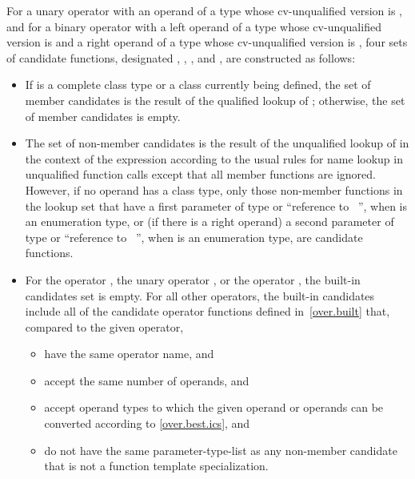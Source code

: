 \pnum
For a unary operator
with an operand of a type whose cv-unqualified version is
,
and for a binary operator
with a left operand of a type whose cv-unqualified version is
and a right operand of a type whose cv-unqualified version is
,
four sets of candidate functions, designated
,
,
,
and
,
are constructed as follows:
\begin{itemize}
\item
If
is a complete class type or a class currently being defined, the set of member candidates is the
result of the qualified lookup of
; otherwise, the set of member
candidates is empty.
\item
The set of non-member candidates is the result of the unqualified lookup of
in the context of
the expression according to the usual rules for name
lookup in unqualified function calls except
that all member functions are ignored.
However, if no operand has a class type, only those non-member
functions in the lookup set that have a first parameter of type
or ``reference to \cv{}~'',
when
is an enumeration type,
or (if there is a right operand) a second parameter of type
or ``reference to \cv{}~'',
when
is an enumeration type,
are candidate functions.
\item
For the operator
\tcode{,},
the unary operator
\tcode{\&},
or the operator
\tcode{->},
the built-in candidates set is empty.
For all other operators, the built-in candidates include all
of the candidate operator functions defined in~\ref{over.built} that,
compared to the given operator,
\begin{itemize}
\item
have the same operator name, and
\item
accept the same number of operands, and
\item
accept operand types to which the given operand or
operands can be converted according to \ref{over.best.ics}, and
\item
do not have the same parameter-type-list as any non-member candidate
that is not a function template specialization.
\end{itemize}


\end{itemize}
